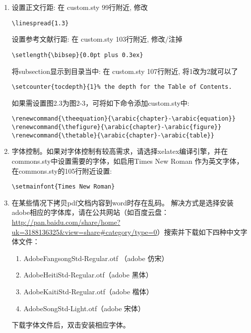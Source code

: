 \begin{enumerate}
       \verb+\chapter{item name}+  and \verb+\section*{item name}+

       来显式实现的 (请仔细观察下Frontpage.tex, Prematter.tex, Backmatter.tex)，从而你可以随意添加，放置，和修改他们，如同一般章节。对于图表目录名称则可在ucasthesis.cfg中进行修改。
   \item 设置正文行距: 在 custom.sty 99行附近, 修改

       \verb|\linespread{1.3}|

       设置参考文献行距: 在 custom.sty 103行附近, 修改/注掉

       \verb|\setlength{\bibsep}{0.0pt plus 0.3ex}|

       将subsection显示到目录当中: 在 custom.sty 107行附近, 将1改为2就可以了

       \verb|\setcounter{tocdepth}{1}% the depth for the Table of Contents.|

       如果需设置图2.3为图2-3，可将如下命令添加custom.sty中:

       \begin{verbatim}
\renewcommand{\theequation}{\arabic{chapter}-\arabic{equation}}
\renewcommand{\thefigure}{\arabic{chapter}-\arabic{figure}}
\renewcommand{\thetable}{\arabic{chapter}-\arabic{table}}
      \end{verbatim}
  \item 字体控制。如果对字体控制有较高需求，请选择xelatex编译引擎，并在commons.sty中设置需要的字体，如启用Times New Roman 作为英文字体，在commons.sty的105行附近设置:

      \verb+\setmainfont{Times New Roman}+
  \item 在某些情况下拷贝pdf文档内容到word时存在乱码。
      解决方式是选择安装adobe相应的字体库，请在公共网站（如百度云盘：\url{http://pan.baidu.com/share/home?uk=3188136325&view=share#category/type=0}）搜索并下载如下四种中文字体文件：
      \begin{enumerate}
          \item AdobeFangsongStd-Regular.otf （adobe 仿宋）
          \item AdobeHeitiStd-Regular.otf（adobe 黑体）
          \item AdobeKaitiStd-Regular.otf（adobe 楷体）
          \item AdobeSongStd-Light.otf（adobe 宋体）
      \end{enumerate}
      下载字体文件后，双击安装相应字体。
      

\end{enumerate}

